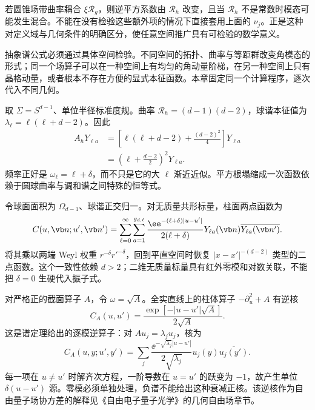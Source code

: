 若圆锥场带曲率耦合 $\xi\mathcal R_g$，则逆平方系数由 $\mathcal R_h$ 改变，且当 $\mathcal R_h$ 不是常数时模态可能发生混合。不能在没有检验这些额外项的情况下直接套用上面的 $\nu_j$。正是这种对定义域与几何条件的明确区分，使任意空间推广具有可检验的数学意义。

抽象谱公式必须通过具体空间检验。不同空间的拓扑、曲率与等距群改变角模态的形式；同一个场算子可以在一种空间上有均匀的角动量阶梯，在另一种空间上只有晶格动量，或者根本不存在方便的显式本征函数。本章固定同一个计算程序，逐次代入不同几何。

取 $\Sigma=S^{d-1}$、单位半径标准度规。曲率 $\mathcal R_h=(d-1)(d-2)$，球谐本征值为 $\lambda_\ell=\ell(\ell+d-2)$。因此
\begin{align}
 A_hY_{\ell a}&=\left[\ell(\ell+d-2)+\frac{(d-2)^2}{4}\right]Y_{\ell a}\nonumber\\
 &=\left(\ell+\frac{d-2}{2}\right)^2Y_{\ell a}.
 \label{eq:ghs-sphere-perfect-square-general}
\end{align}
频率正好是 $\omega_\ell=\ell+\delta$，而不只是它的大 $\ell$ 渐近近似。平方根塌缩成一次函数依赖于圆球曲率与调和谱之间特殊的恒等式。

令球面面积为 $\Omega_{d-1}$、球谐正交归一。对无质量共形标量，柱面两点函数为
\begin{equation}\label{eq:ghs-sphere-cylinder-correlator}
 C(u,\vb n;u',\vb n')
 =\sum_{\ell=0}^\infty\sum_{a=1}^{g_{d,\ell}}
 \frac{\ee^{-(\ell+\delta)|u-u'|}}{2(\ell+\delta)}
 Y_{\ell a}(\vb n)\overline{Y_{\ell a}(\vb n')}.
\end{equation}
将其乘以两端 Weyl 权重 $r^{-\delta}r'^{-\delta}$，回到平直空间时恢复 $|x-x'|^{-(d-2)}$ 类型的二点函数。这个一致性依赖 $d>2$；二维无质量标量具有红外零模和对数关联，不能把 $\delta=0$ 生硬代入振子式。

对严格正的截面算子 $A$，令 $\omega=\sqrt A$。全实直线上的柱体算子 $-\partial_u^2+A$ 有逆核
\begin{equation}\label{eq:math-ghs-positive-cylinder-kernel}
 C_A(u,u')=\frac{\exp[-|u-u'|\sqrt A]}{2\sqrt A}.
\end{equation}
这是谱定理给出的逐模逆算子：对 $Au_j=\lambda_ju_j$，核为
\[
 C_A(u,y;u',y')=\sum_j\frac{\ee^{-\sqrt{\lambda_j}|u-u'|}}{2\sqrt{\lambda_j}}
 u_j(y)\overline{u_j(y')}.
\]
每一项在 $u\ne u'$ 时解齐次方程，一阶导数在 $u=u'$ 的跃变为 $-1$，故产生单位 $\delta(u-u')$ 源。零模必须单独处理，负谱不能给出这种衰减正核。该逆核作为自由量子场协方差的解释见《自由电子量子光学》的几何自由场章节。

